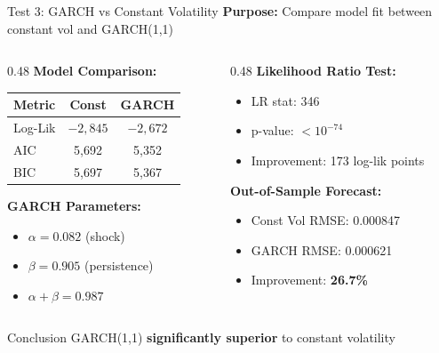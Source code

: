 \documentclass[11pt,aspectratio=169]{beamer}
\begin{document}
	\begin{frame}{Test 3: GARCH vs Constant Volatility}
		\textbf{Purpose:} Compare model fit between constant vol and GARCH(1,1)
		
		\vspace{0.2cm}
		
		\begin{columns}[T]
			\begin{column}{0.48\textwidth}
				\textbf{Model Comparison:}
				\scriptsize
				\begin{table}
					\begin{tabular}{|l|c|c|}
						\hline
						\textbf{Metric} & \textbf{Const} & \textbf{GARCH} \\
						\hline
						Log-Lik & $-2,845$ & $-2,672$ \\
						AIC & 5,692 & 5,352 \\
						BIC & 5,697 & 5,367 \\
						\hline
					\end{tabular}
				\end{table}
				\normalsize
				
				\textbf{GARCH Parameters:}
				\begin{itemize}
					\item $\alpha = 0.082$ (shock)
					\item $\beta = 0.905$ (persistence)
					\item $\alpha + \beta = 0.987$
				\end{itemize}
			\end{column}
			
			\begin{column}{0.48\textwidth}
				\textbf{Likelihood Ratio Test:}
				\begin{itemize}
					\item LR stat: 346
					\item p-value: $< 10^{-74}$
					\item Improvement: 173 log-lik points
				\end{itemize}
				
				\vspace{0.3cm}
				
				\textbf{Out-of-Sample Forecast:}
				\begin{itemize}
					\item Const Vol RMSE: 0.000847
					\item GARCH RMSE: 0.000621
					\item Improvement: \textbf{26.7\%}
				\end{itemize}
			\end{column}
		\end{columns}
		
		\vspace{0.3cm}
		
		\begin{alertblock}{Conclusion}
			GARCH(1,1) \textbf{significantly superior} to constant volatility
		\end{alertblock}
	\end{frame}
	
\end{document}

